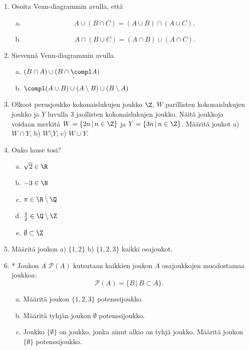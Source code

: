 \begin{enumerate}
\item Osoita Venn-diagrammin avulla, että
\begin{enumerate}[a)]
\item 
\[
A\cup (B \cap C) = (A\cup B)\cap(A\cup C),
\]
\item 
\[
A\cap (B \cup C) = (A\cap B)\cup(A\cap C).
\]
\end{enumerate}

\item Sievennä Venn-diagrammin avulla.
\begin{enumerate}[a)]
\item $(B\cap A) \cup (B \cap \compl A)$
\item $\compl (A\cup B) \cup (A \setminus B) \cup (B \setminus A)$
\end{enumerate}

\item
Olkoot perusjoukko kokonaislukujen joukko $\Z$, $W$ parillisten kokonaislukujen joukko ja $Y$ luvulla $3$ jaollisten kokonaislukujen joukko. Näitä joukkoja voidaan merkitä $W = \{2n\,|\, n\in\Z\}$ ja $Y = \{3n \,|\, n \in \Z\}$. Määritä joukot a) $W \cap Y$, b) $W \setminus Y$, c) $W \cup Y$.

\item Onko lause tosi?
\begin{enumerate}[a)]
\item $\sqrt{2} \in \R$
\item $-3 \in \N$
\item $\pi \in \R \setminus \Q$
\item $\frac{4}{2} \in \Q \setminus \Z$
\item $\emptyset \subset \Z$
\end{enumerate}

\item Määritä joukon a) $\{1,2\}$ b) $\{1,2,3\}$ kaikki osajoukot.

\item * %
Joukon $A$  $\mathcal{P}(A)$ kutsutaan kaikkien joukon $A$ osajoukkojen muodostamaa joukkoa:
\[
\mathcal{P}(A)=\{ B \, | \, B\subset A\}.
\]
\begin{enumerate}[a)]
\item Määritä joukon $\{1,2,3\}$ potenssijoukko.
\item Määritä tyhjän joukon $\emptyset$ potenssijoukko.
\item Joukko $\{\emptyset\}$ on joukko, jonka ainut alkio on tyhjä joukko. Määritä joukon $\{\emptyset\}$ potenssijoukko.
\end{enumerate}


\end{enumerate}
